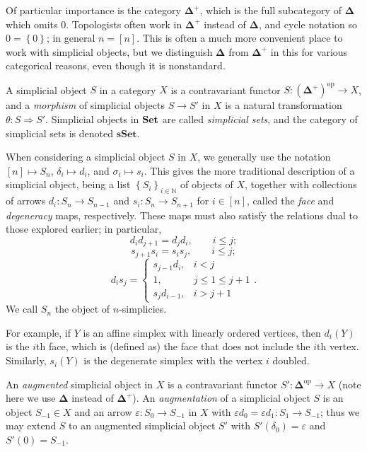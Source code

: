Of particular importance is the category $\boldsymbol{\Delta} ^+$, which is the full subcategory of $\boldsymbol{\Delta} $ which omits $0$. Topologists often work in $\boldsymbol{\Delta} ^+$ instead of $\boldsymbol{\Delta} $, and cycle notation so $0=\left\{ 0 \right\} $; in general $n=[n]$. This is often a much more convenient place to work with simplicial objects, but we distinguish $\boldsymbol{\Delta} $ from $\boldsymbol{\Delta} ^+$ in this for various categorical reasons, even though it is nonstandard.

\begin{definition}\label{dfn:7.7}
	A simplicial object $S$ in a category $X$ is a contravariant functor $S : \left( \boldsymbol{\Delta}^+ \right)^{\mathrm{op} }  \to X$, and a \emph{morphism} of simplicial objects $S\to S'$ in $X$ is a natural transformation $\theta : S \Rightarrow S'$. Simplicial objects in $\mathbf{Set} $ are called \emph{simplicial sets}, and the category of simplicial sets is denoted $\mathbf{sSet}$.
\end{definition}

When considering a simplicial object $S$ in $X$, we generally use the notation $[n]\mapsto S_n$, $\delta_i \mapsto d_i$, and $\sigma_i \mapsto s_i$. This gives the more traditional description of a simplicial object, being a list $\left\{ S_i \right\}_{i\in\mathbb{N} } $ of objects of $X$, together with collections of arrows $d_i : S_n \to S_{n-1} $ and $s_i : S_n \to S_{n+1} $ for $i\in[n]$, called the \emph{face} and \emph{degeneracy} maps, respectively. These maps must also satisfy the relations dual to those explored earlier; in particular,
\[
	d_id_{j+1} =d_jd_i,\qquad i\leq j
;\]
\[
	s_{j+1}s_{i} =s_is_j,\qquad i\leq j;
\]
\[
	d_is_j=
	\begin{cases}
		s_{j-1} d_i,&i<j\\
		1,&j\leq 1\leq j+1\\
		s_jd_{i-1} ,&i>j+1
	\end{cases}
.\]
We call $S_n$ the object of $n$-simplicies.

For example, if $Y$ is an affine simplex with linearly ordered vertices, then $d_i(Y)$ is the $i$th face, which is (defined as) the face that does not include the $i$th vertex. Similarly, $s_i(Y)$ is the degenerate simplex with the vertex $i$ doubled.

An \emph{augmented} simplicial object in $X$ is a contravariant functor $S': \boldsymbol{\Delta}^{\mathrm{op} }   \to X$ (note here we use $\boldsymbol{\Delta} $ instead of $\boldsymbol{\Delta} ^+$). An \emph{augmentation} of a simplicial object $S$ is an object $S_{-1} \in X$ and an arrow $\varepsilon : S_0 \to S_{-1} $ in $X$ with $\varepsilon d_0=\varepsilon d_1: S_1 \to S_{-1} $; thus we may extend $S$ to an augmented simplicial object $S'$ with $S'(\delta_0)=\varepsilon $ and $S'(0)=S_{-1} $.

